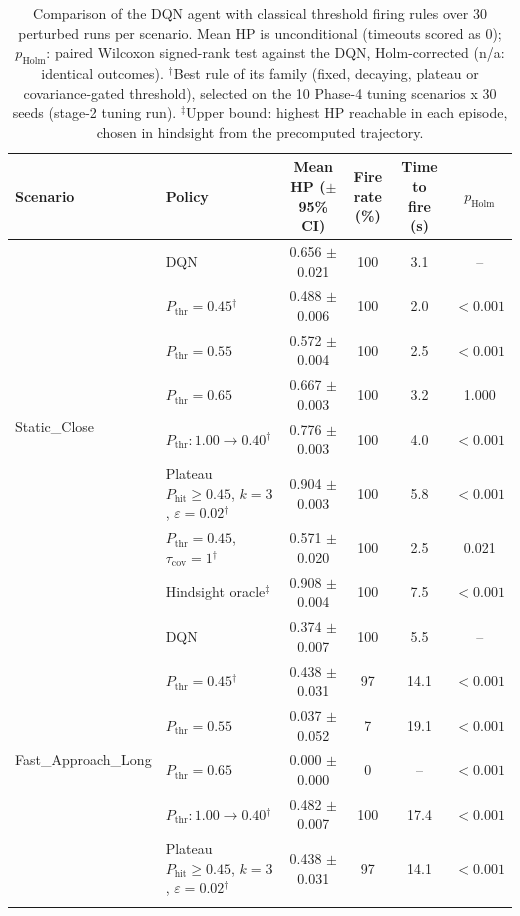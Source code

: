 \begin{table}[htbp]
\centering
\caption{Comparison of the DQN agent with classical threshold firing rules over 30 perturbed runs per scenario. Mean HP is unconditional (timeouts scored as 0); $p_{\mathrm{Holm}}$: paired Wilcoxon signed-rank test against the DQN, Holm-corrected (n/a: identical outcomes). $^{\dagger}$Best rule of its family (fixed, decaying, plateau or covariance-gated threshold), selected on the 10 Phase-4 tuning scenarios x 30 seeds (stage-2 tuning run). $^{\ddagger}$Upper bound: highest HP reachable in each episode, chosen in hindsight from the precomputed trajectory.}
\label{tab:comparison-traditional-rl}
\small
\begin{tabular}{llcccc}
\toprule
\textbf{Scenario} & \textbf{Policy} & \textbf{Mean HP ($\pm$95\% CI)} & \textbf{Fire rate (\%)} & \textbf{Time to fire (s)} & $p_{\mathrm{Holm}}$ \\
\midrule
\multirow{8}{*}{Static\_Close} & DQN & 0.656 $\pm$ 0.021 & 100 & 3.1 & -- \\
 & $P_{\mathrm{thr}}=0.45$$^{\dagger}$ & 0.488 $\pm$ 0.006 & 100 & 2.0 & $<0.001$ \\
 & $P_{\mathrm{thr}}=0.55$ & 0.572 $\pm$ 0.004 & 100 & 2.5 & $<0.001$ \\
 & $P_{\mathrm{thr}}=0.65$ & 0.667 $\pm$ 0.003 & 100 & 3.2 & 1.000 \\
 & $P_{\mathrm{thr}}: 1.00 \to 0.40$$^{\dagger}$ & 0.776 $\pm$ 0.003 & 100 & 4.0 & $<0.001$ \\
 & Plateau $P_{\mathrm{hit}}\geq0.45$, $k=3$, $\varepsilon=0.02$$^{\dagger}$ & 0.904 $\pm$ 0.003 & 100 & 5.8 & $<0.001$ \\
 & $P_{\mathrm{thr}}=0.45$, $\tau_{\mathrm{cov}}=1$$^{\dagger}$ & 0.571 $\pm$ 0.020 & 100 & 2.5 & 0.021 \\
 & Hindsight oracle$^{\ddagger}$ & 0.908 $\pm$ 0.004 & 100 & 7.5 & $<0.001$ \\
\midrule
\multirow{8}{*}{Fast\_Approach\_Long} & DQN & 0.374 $\pm$ 0.007 & 100 & 5.5 & -- \\
 & $P_{\mathrm{thr}}=0.45$$^{\dagger}$ & 0.438 $\pm$ 0.031 & 97 & 14.1 & $<0.001$ \\
 & $P_{\mathrm{thr}}=0.55$ & 0.037 $\pm$ 0.052 & 7 & 19.1 & $<0.001$ \\
 & $P_{\mathrm{thr}}=0.65$ & 0.000 $\pm$ 0.000 & 0 & -- & $<0.001$ \\
 & $P_{\mathrm{thr}}: 1.00 \to 0.40$$^{\dagger}$ & 0.482 $\pm$ 0.007 & 100 & 17.4 & $<0.001$ \\
 & Plateau $P_{\mathrm{hit}}\geq0.45$, $k=3$, $\varepsilon=0.02$$^{\dagger}$ & 0.438 $\pm$ 0.031 & 97 & 14.1 & $<0.001$ \\
$$
\end{tabular}
\end{table}
